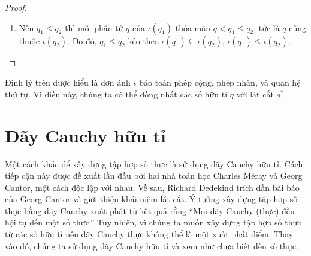 \begin{proof}
\begin{enumerate}[label={(\roman*)}]
\begin{enumerate}[label={\textbf{Trường hợp \arabic*.}},itemindent=2cm]
                        Như vậy $\iota(q_{1}q_{2}) = \iota(q_{1})\iota(q_{2})$ với mọi số hữu tỉ âm $q_{1}$ và số hữu tỉ dương $q_{2}$.
                  \item  $q_{1} < 0$ và $q_{2} < 0$.
                        \begin{align*}
                            \iota(q_{1}q_{2}) & = \iota((-q_{1})(-q_{2}))                                                                          \\
                                              & = \iota(-q_{1})\iota(-q_{2})      & \text{(theo \textbf{Trường hợp 2})}                            \\
                                              & = (-\iota(q_{1}))(-\iota(-q_{2}))                                                                  \\
                                              & = \iota(q_{1})\iota(q_{2})        & \text{(theo Mệnh đề~\ref{proposition:dedekind-cuts-and-sign})}
                        \end{align*}

                        Như vậy $\iota(q_{1}q_{2}) = \iota(q_{1})\iota(q_{2})$ với mọi số hữu tỉ âm $q_{1}, q_{2}$.
              \end{enumerate}

              Vậy $\iota(q_{1}q_{2}) = \iota(q_{1})\iota(q_{2})$ với mọi số hữu tỉ $q_{1}, q_{2}$.
        \item Nếu $q_{1}\leq q_{2}$ thì mỗi phần tử $q$ của $\iota(q_{1})$ thỏa mãn $q < q_{1}\leq q_{2}$, tức là $q$ cũng thuộc $\iota(q_{2})$. Do đó, $q_{1}\leq q_{2}$ kéo theo $\iota(q_{1})\subseteq \iota(q_{2})$, $\iota(q_{1})\leq \iota(q_{2})$.
    \end{enumerate}
\end{proof}

Định lý trên được hiểu là đơn ánh $\iota$ bảo toàn phép cộng, phép nhân, và quan hệ thứ tự. Vì điều này, chúng ta có thể đồng nhất các số hữu tỉ $q$ với lát cắt $q^{*}$.

\section{Dãy Cauchy hữu tỉ}

Một cách khác để xây dựng tập hợp số thực là sử dụng dãy Cauchy hữu tỉ. Cách tiếp cận này được đề xuất lần đầu bởi hai nhà toán học Charles M\'{e}ray và Georg Cantor, một cách độc lập với nhau. Về sau, Richard Dedekind trích dẫn bài báo của Georg Cantor và giới thiệu khái niệm lát cắt. Ý tưởng xây dựng tập hợp số thực bằng dãy Cauchy xuất phát từ kết quả rằng ``Mọi dãy Cauchy (thực) đều hội tụ đến một số thực.'' Tuy nhiên, vì chúng ta muốn xây dựng tập hợp số thực từ các số hữu tỉ nên dãy Cauchy thực không thể là một xuất phát điểm. Thay vào đó, chúng ta sử dụng dãy Cauchy hữu tỉ và xem như chưa biết đến số thực.

